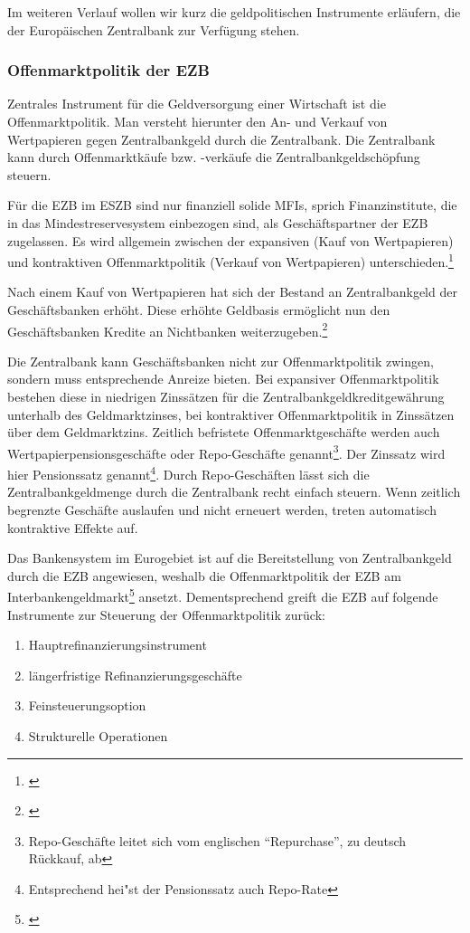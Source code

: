 \documentclass[
        onecolumn,
        a4paper,
        abstracton,
        parskip=half
        ,final
        ]{scrartcl}
\begin{document}
Im weiteren Verlauf wollen wir kurz die geldpolitischen Instrumente erl{\"a}ufern, die der Europ{\"a}ischen Zentralbank zur Verf{\"u}gung stehen.



\subsubsection{Offenmarktpolitik der EZB}  %

Zentrales Instrument f{\"u}r die Geldversorgung einer Wirtschaft ist die Offenmarktpolitik. Man versteht hierunter den An- und Verkauf von Wertpapieren gegen Zentralbankgeld durch die Zentralbank.
Die Zentralbank kann durch Offenmarktk{\"a}ufe bzw. -verk{\"a}ufe die Zentralbankgeldsch{\"o}pfung steuern.

F{\"u}r die EZB im \ac{ESZB} sind nur finanziell solide \ac{MFIs}, sprich Finanzinstitute, die in das Mindestreservesystem einbezogen sind, als Gesch{\"a}ftspartner der \ac{EZB} zugelassen. Es wird allgemein zwischen der expansiven (Kauf von Wertpapieren) und kontraktiven Offenmarktpolitik (Verkauf von Wertpapieren) unterschieden.\footnote[54]{\citep*[S.556]{Basseler2010}}

Nach einem Kauf von Wertpapieren hat sich der Bestand an Zentralbankgeld der Gesch{\"a}ftsbanken erh{\"o}ht. Diese erh{\"o}hte Geldbasis erm{\"o}glicht nun den Gesch{\"a}ftsbanken Kredite an Nichtbanken weiterzugeben.\footnote[55]{\citep*[S.557]{Basseler2010}}


Die Zentralbank kann Gesch{\"a}ftsbanken nicht zur Offenmarktpolitik zwingen, sondern muss entsprechende Anreize bieten. Bei expansiver Offenmarktpolitik bestehen diese in niedrigen Zinss{\"a}tzen f{\"u}r die Zentralbankgeldkreditgew{\"a}hrung unterhalb des Geldmarktzinses, bei kontraktiver Offenmarktpolitik in Zinss{\"a}tzen {\"u}ber dem Geldmarktzins.
Zeitlich befristete Offenmarktgesch{\"a}fte werden auch Wertpapierpensionsgesch{\"a}fte oder Repo-Gesch{\"a}fte genannt\footnote[36]{Repo-Gesch{\"a}fte leitet sich vom englischen "`Repurchase"', zu deutsch R{\"u}ckkauf, ab}. Der Zinssatz wird hier Pensionssatz genannt\footnote[37]{Entsprechend hei{"s}t der Pensionssatz auch Repo-Rate}.
Durch Repo-Gesch{\"a}ften l{\"a}sst sich die Zentralbankgeldmenge durch die Zentralbank recht einfach steuern. Wenn zeitlich begrenzte Gesch{\"a}fte auslaufen und nicht erneuert werden, treten automatisch kontraktive Effekte auf.


Das Bankensystem im Eurogebiet ist auf die Bereitstellung von Zentralbankgeld durch die EZB angewiesen, weshalb die Offenmarktpolitik der EZB am Interbankengeldmarkt\footnote[53]{\citep*[vgl.][S.558f]{Basseler2010}} ansetzt. Dementsprechend greift die EZB auf folgende Instrumente zur Steuerung der Offenmarktpolitik zur{\"u}ck:
\begin{enumerate}
 \item{Hauptrefinanzierungsinstrument}
 \item{l{\"a}ngerfristige Refinanzierungsgesch{\"a}fte}
 \item{Feinsteuerungsoption}
 \item{Strukturelle Operationen}
 \end{enumerate}
\end{document}

